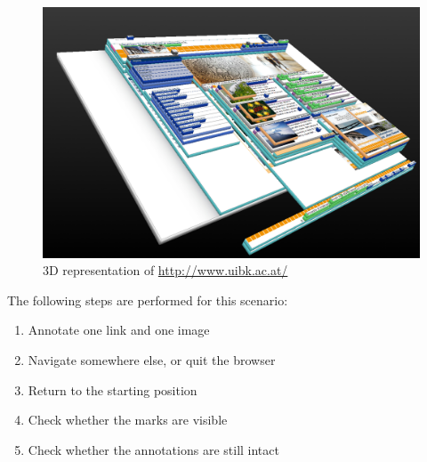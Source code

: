 \begin{figure}\centering
		\includegraphics[width=13cm]{images/3d-uibk.png}
		\caption{3D representation of \url{http://www.uibk.ac.at/}}
		\label{3d-uibk}
\end{figure} 

The following steps are performed for this scenario:
\begin{enumerate}
\item Annotate one link and one image
\item Navigate somewhere else, or quit the browser
\item Return to the starting position
\item Check whether the marks are visible
\item Check whether the annotations are still intact
\end{enumerate}
